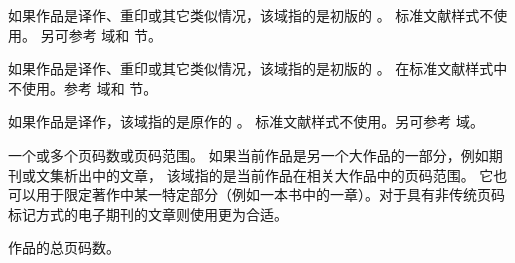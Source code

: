 \begin{fieldlist}

如果作品是译作、重印或其它类似情况，该域指的是初版的 。
标准文献样式不使用。
另可参考  域和  节。




如果作品是译作、重印或其它类似情况，该域指的是初版的 。
在标准文献样式中不使用。参考  域和  节。




如果作品是译作，该域指的是原作的 。
标准文献样式不使用。另可参考  域。





一个或多个页码数或页码范围。
如果当前作品是另一个大作品的一部分，例如期刊或文集析出中的文章，
该域指的是当前作品在相关大作品中的页码范围。
它也可以用于限定著作中某一特定部分（例如一本书中的一章）。对于具有非传统页码标记方式的电子期刊的文章则使用更为合适。




作品的总页码数。



\end{fieldlist}
